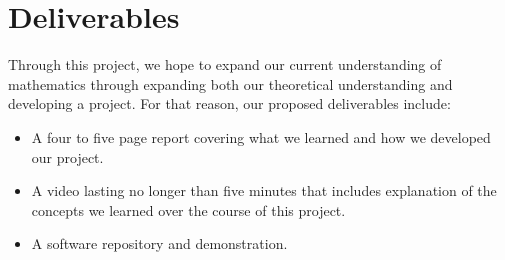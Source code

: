 \documentclass{article}
\begin{document}
\section{Deliverables}
Through this project, we hope to expand our current understanding of mathematics through expanding both our theoretical understanding and developing a project. For that reason, our proposed deliverables include:
\begin{itemize}
  \item A four to five page report covering what we learned and how we developed our project.
  \item A video lasting no longer than five minutes that includes explanation of the concepts we learned over the course of this project.
  \item A software repository and demonstration.
\end{itemize}
\end{document}
